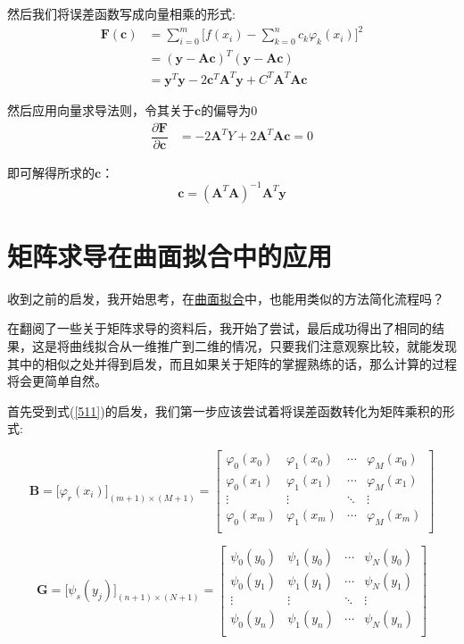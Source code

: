 然后我们将误差函数写成向量相乘的形式:
\begin{align}
\label{511}
\bm{F}(\bm{c})&=\sum_{i=0}^m\big[f(x_i)-
\sum_{k=0}^nc_k\varphi_{k}(x_i)\big]^2\\
&=
(\bm{y}-\bm{A}\bm{c})^T(\bm{y}-\bm{A}\bm{c})\\
&=
\bm{y}^T\bm{y}-2\bm{c}^T\bm{A}^T\bm{y}+C^T\bm{A}^T\bm{A}\bm{c}
\end{align}

然后应用向量求导法则，令其关于$\bm{c}$的偏导为0
\begin{align}
\dfrac{\partial \bm{F}}{\partial \bm{c}}&=
-2\bm{A}^TY+2\bm{A}^T\bm{A}\bm{c}=0
\end{align}

即可解得所求的$\bm{c}$：
\begin{equation}
\label{ccc}
\boxed{
\bm{c}=(\bm{A}^T\bm{A})^{-1}\bm{A}^T\bm{y}
}
\end{equation}


\section{矩阵求导在曲面拟合中的应用}
收到之前的启发，我开始思考，在\hyperref[sec:qmnh]{曲面拟合}中，也能用类似的方法简化流程吗？

在翻阅了一些关于矩阵求导的资料后，我开始了尝试，最后成功得出了相同的结果，这是将曲线拟合从一维推广到二维的情况，只要我们注意观察比较，就能发现其中的相似之处并得到启发，而且如果关于矩阵的掌握熟练的话，那么计算的过程将会更简单自然。

首先受到式(\ref{511})的启发，我们第一步应该尝试着将误差函数转化为矩阵乘积的形式:

\[\bm{B} =\big[\varphi_{r}(x_i)\big]_{(m+1)\times (M+1)}=
\begin{bmatrix}
{\varphi_{0}(x_0)}&{\varphi_{1}(x_0)}& \cdots &{\varphi_{M}(x_0)}\\
{\varphi_{0}(x_1)}&{\varphi_{1}(x_1)}& \cdots &{\varphi_{M}(x_1)}\\
 \vdots & \vdots & \ddots & \vdots \\
{\varphi_{0}(x_m)}&{\varphi_{1}(x_m)}& \cdots &{\varphi_{M}(x_m)}\\
\end{bmatrix}\]

\[\bm{G} =\big[\psi_{s}(y_j)\big]_{(n+1)\times (N+1)}=
\begin{bmatrix}
{\psi_{0}(y_0)}&{\psi_{1}(y_0)}& \cdots &{\psi_{N}(y_0)}\\
{\psi_{0}(y_1)}&{\psi_{1}(y_1)}& \cdots &{\psi_{N}(y_1)}\\
 \vdots & \vdots & \ddots & \vdots \\
{\psi_{0}(y_n)}&{\psi_{1}(y_n)}& \cdots &{\psi_{N}(y_n)}\\
\end{bmatrix}\]

